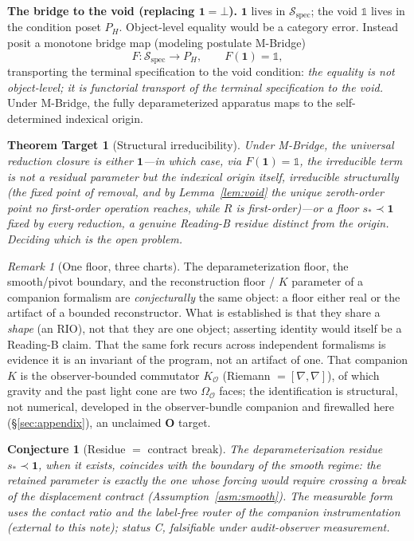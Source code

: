 \documentclass[11pt]{article}
\newtheorem*{theoremtarget}{Theorem Target}
\newtheorem*{conjecture}{Conjecture}
\theoremstyle{definition}
\theoremstyle{remark}
\newtheorem*{remark}{Remark}
\newcommand{\Sspec}{\mathcal{S}_{\mathrm{spec}}}
\begin{document}
\medskip\noindent\textbf{The bridge to the void (replacing $\mathbf{1}=\bot$).} $\mathbf{1}$ lives in
$\Sspec$; the void $\mathbb{1}$ lives in the condition poset $P_H$. Object-level equality would be a
category error. Instead posit a monotone bridge map (modeling postulate M-Bridge)
\[
  F:\Sspec\to P_H,\qquad F(\mathbf{1})=\mathbb{1},
\]
transporting the terminal specification to the void condition: \emph{the equality is not object-level;
it is functorial transport of the terminal specification to the void.} Under M-Bridge, the fully
deparameterized apparatus maps to the self-determined indexical origin.

\begin{theoremtarget}[Structural irreducibility]
Under M-Bridge, the universal reduction closure is either $\mathbf{1}$---in which case, via
$F(\mathbf{1})=\mathbb{1}$, the irreducible term is not a residual parameter but the indexical origin
itself, irreducible structurally (the fixed point of removal, and by Lemma~\ref{lem:void} the unique
zeroth-order point no first-order operation reaches, while $R$ is first-order)---or a floor
$s_*\prec\mathbf{1}$ fixed by every reduction, a genuine Reading-B residue distinct from the origin.
Deciding which is the open problem.
\end{theoremtarget}

\begin{remark}[One floor, three charts]
The deparameterization floor, the smooth/pivot boundary, and the reconstruction floor / $K$ parameter
of a companion formalism are \emph{conjecturally} the same object: a floor either real or the artifact
of a bounded reconstructor. What is established is that they share a \emph{shape} (an RIO), not that
they are one object; asserting identity would itself be a Reading-B claim. That the same fork recurs
across independent formalisms is evidence it is an invariant of the program, not an artifact of one.
That companion $K$ is the observer-bounded commutator $K_{\mathcal O}$ (Riemann $=[\nabla,\nabla]$), of
which gravity and the past light cone are two $\Omega_{\mathcal O}$ faces; the identification is
structural, not numerical, developed in the observer-bundle companion and firewalled here
(\S\ref{sec:appendix}), an unclaimed \textbf{O} target.
\end{remark}

\begin{conjecture}[Residue $=$ contract break]
The deparameterization residue $s_*\prec\mathbf{1}$, when it exists, coincides with the boundary of
the smooth regime: the retained parameter is exactly the one whose forcing would require crossing a
break of the displacement contract (Assumption~\ref{asm:smooth}). The measurable form uses the
contact ratio and the label-free router of the companion instrumentation (external to this note);
status C, falsifiable under audit-observer measurement.
\end{conjecture}
\end{document}
